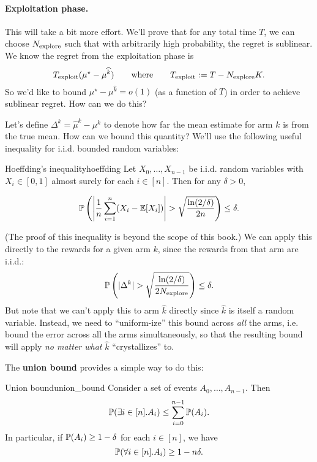 \documentclass[\main/main]{subfiles}
\begin{document}
\paragraph*{Exploitation phase.} This will take a bit more effort. We'll prove that for any total time $T$, we can choose $\Nex$ such that with arbitrarily high probability, the regret is sublinear. We know the regret from the exploitation phase is
\[
    T_{\text{exploit}} (\mu^\star - \mu^{\hat k}) \qquad \text{where} \qquad T_{\text{exploit}} := T - \Nex K.
\]
So we'd like to bound $\mu^\star - \mu^{\hat k} = o(1)$ (as a function of $T$) in order to achieve sublinear regret. How can we do this?

Let's define $\Delta^k = \hat \mu^k - \mu^k$ to denote how far the mean estimate for arm $k$ is from the true mean. How can we bound this quantity? We'll use the following useful inequality for i.i.d. bounded random variables:

\begin{theorem}{Hoeffding's inequality}{hoeffding}
    Let $X_0, \dots, X_{n-1}$ be i.i.d. random variables with $X_i \in [0, 1]$ almost surely for each $i \in [n]$. Then for any $\delta > 0$,

    \begin{equation}
        \P\left( \left| \frac{1}{n} \sum_{i=1}^n (X_i - \E[X_i]) \right| > \sqrt{\frac{\ln(2/\delta)}{2n}} \right) \le \delta.
    \end{equation}
\end{theorem}

(The proof of this inequality is beyond the scope of this book.) We can apply this directly to the rewards for a given arm $k$, since the rewards from that arm are i.i.d.:
\begin{equation}
    \P\left(|\Delta^k | > \sqrt{\frac{\ln(2/\delta)}{2\Nex}} \right) \le \delta. \label{eq:hoeffding-etc}
\end{equation}
But note that we can't apply this to arm $\hat k$ directly since $\hat k$ is itself a random variable. Instead, we need to ``uniform-ize'' this bound across \emph{all} the arms, i.e. bound the error across all the arms simultaneously, so that the resulting bound will apply \emph{no matter what} $\hat k$ ``crystallizes'' to.

The \textbf{union bound} provides a simple way to do this:

\begin{theorem}{Union bound}{union_bound}
    Consider a set of events $A_0, \dots, A_{n-1}$. Then \[
        \P(\exists i \in [n]. A_i) \le \sum_{i=0}^{n-1} \P(A_i).
    \]
    In particular, if $\P(A_i) \ge 1 - \delta$ for each $i \in [n]$, we have \[
        \P(\forall i \in [n]. A_i) \ge 1 - n \delta.
    \]
\end{theorem}
\end{document}
